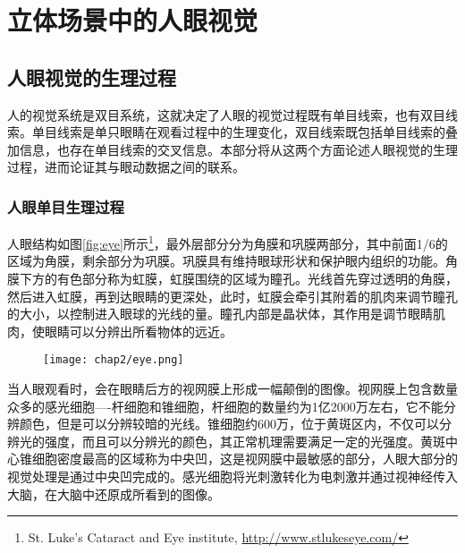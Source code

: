 
\chapter{ 立体场景中的人眼视觉}
\label{chap:humanview}

\section{人眼视觉的生理过程}
\label{sec:humanvisual}

人的视觉系统是双目系统，这就决定了人眼的视觉过程既有单目线索，也有双目线索。单目线索是单只眼睛在观看过程中的生理变化，双目线索既包括单目线索的叠加信息，也存在单目线索的交叉信息。本部分将从这两个方面论述人眼视觉的生理过程，进而论证其与眼动数据之间的联系。
\subsection{人眼单目生理过程}
\label{sec:singleye}

人眼结构如图\ref{fig:eye}所示\footnote[1]{St. Luke’s Cataract and Eye institute, \url{http://www.stlukeseye.com/}}，最外层部分分为角膜和巩膜两部分，其中前面1/6的区域为角膜，剩余部分为巩膜。巩膜具有维持眼球形状和保护眼内组织的功能。角膜下方的有色部分称为虹膜，虹膜围绕的区域为瞳孔。光线首先穿过透明的角膜，然后进入虹膜，再到达眼睛的更深处，此时，虹膜会牵引其附着的肌肉来调节瞳孔的大小，以控制进入眼球的光线的量。瞳孔内部是晶状体，其作用是调节眼睛肌肉，使眼睛可以分辨出所看物体的远近。
\begin{figure}[!htp]
  \centering
  \texttt{[image: chap2/eye.png]}
\end{figure}
当人眼观看时，会在眼睛后方的视网膜上形成一幅颠倒的图像。视网膜上包含数量众多的感光细胞----杆细胞和锥细胞，杆细胞的数量约为1亿2000万左右，它不能分辨颜色，但是可以分辨较暗的光线。锥细胞约600万，位于黄斑区内，不仅可以分辨光的强度，而且可以分辨光的颜色，其正常机理需要满足一定的光强度。黄斑中心锥细胞密度最高的区域称为中央凹，这是视网膜中最敏感的部分，人眼大部分的视觉处理是通过中央凹完成的。感光细胞将光刺激转化为电刺激并通过视神经传入大脑，在大脑中还原成所看到的图像\parencite{atchison2000optics}。

